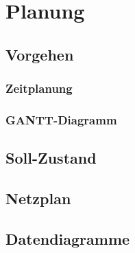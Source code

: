 \chapter{Planung}

\section{Vorgehen}

\subsection{Zeitplanung}

\subsection{GANTT-Diagramm}

\section{Soll-Zustand}

\section{Netzplan}

\section{Datendiagramme}

